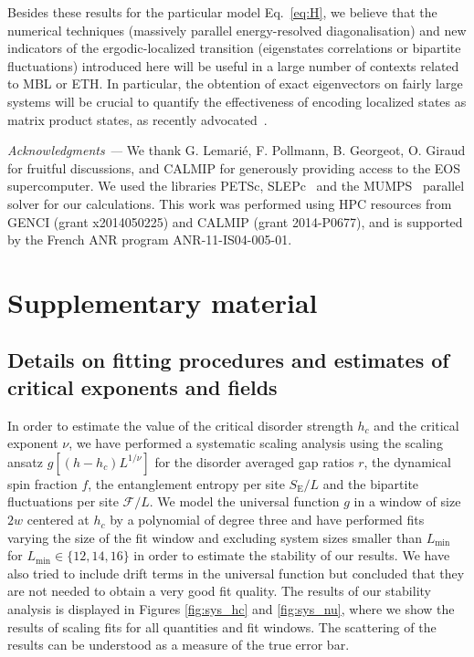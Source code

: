 \documentclass[prl,a4paper,twocolumn,groupedaddress,english,showpacs]{revtex4-1}
\begin{document}
Besides these results for the particular model Eq.~\ref{eq:H}, we believe that the numerical
techniques (massively parallel energy-resolved diagonalisation) and new indicators of the
ergodic-localized transition (eigenstates correlations or bipartite fluctuations) introduced here
will be useful in a large number of contexts related to MBL or ETH. In particular, the obtention of
exact eigenvectors on fairly large systems will be crucial to quantify the effectiveness of encoding
localized states as matrix product states, as recently
advocated~\cite{friesdorf_many_2014,chandran_spectral_2014,pekker_encoding_2014}.


{\it{Acknowledgments ---}}  We thank G. Lemari\'e, F. Pollmann, B. Georgeot, O. Giraud for fruitful
discussions, and CALMIP for generously providing access to the EOS
supercomputer. We used the libraries PETSc, SLEPc~\cite{hernandez_slepc_2005} and the
MUMPS~\cite{MUMPS1,MUMPS2} parallel solver for our calculations. This work was performed using HPC
resources from GENCI (grant x2014050225) and CALMIP (grant 2014-P0677), and is supported by the
French ANR program ANR-11-IS04-005-01. 


\vspace{-0.57cm}


\appendix

\section{Supplementary material}

\subsection{Details on fitting procedures and estimates of critical exponents and fields}

In order to estimate the value of the critical disorder strength $h_c$ and the critical exponent
$\nu$, we have performed a systematic scaling analysis using the scaling ansatz $g[ (h-h_c)
L^{1/\nu}]$ for the disorder averaged gap ratios ${r}$, the dynamical spin fraction ${f}$,
the entanglement entropy per site $S_\text{E}/L$ and the bipartite fluctuations per site
$\mathcal{F}/L$. We model the universal function $g$ in a window of size $2w$ centered at $h_c$ by a
polynomial of degree three and have performed fits varying the size of the fit window and excluding
system sizes smaller than $L_\text{min}$ for $L_\text{min}\in\{12,14,16\}$ in order to estimate the
stability of our results. We have also tried to include drift terms in the universal function but
concluded that they are not needed to obtain a very good fit quality. The results of our stability
analysis is displayed in Figures \ref{fig:sys_hc} and \ref{fig:sys_nu}, where we show the results
of scaling fits for all quantities and fit windows. The scattering of the results can be understood
as a measure of the true error bar.
\end{document}
